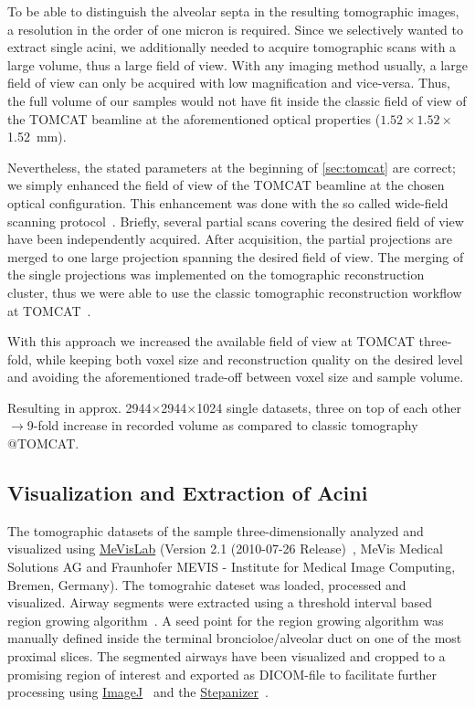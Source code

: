 \documentclass[%
	paper=a4,%
	twoside=true,%
	draft=false,%
	abstract=false]{scrartcl}
\newcommand{\todojcs}[2][]{\todo[color=magenta!62!white, #1]{Johannes: #2}}
\begin{document}
To be able to distinguish the alveolar septa \todojcs{How thick are they in the rat: approx.~\SI{8}{\micro\meter}?} in the resulting tomographic images, a resolution in the order of one micron is required. Since we selectively wanted to extract single acini, we additionally needed to acquire tomographic scans with a large volume, thus a large field of view. With any imaging method usually, a large field of view can only be acquired with low magnification and vice-versa. Thus, the full volume of our samples would not have fit inside the classic field of view of the TOMCAT beamline at the aforementioned optical properties (\(1.52\times1.52\times\)\SI{1.52}{\milli\meter}).

Nevertheless, the stated parameters at the beginning of \autoref{sec:tomcat} are correct; we simply enhanced the field of view of the TOMCAT beamline at the chosen optical configuration. This enhancement was done with the so called wide-field scanning protocol~\cite{Haberthuer2010}. Briefly, several partial scans covering the desired field of view have been independently acquired. After acquisition, the partial projections are merged to one large projection spanning the desired field of view. The merging of the single projections was implemented on the tomographic reconstruction cluster, thus we were able to use the classic tomographic reconstruction workflow at TOMCAT~\cite{Hintermueller2010}.

With this approach we increased the available field of view at TOMCAT three-fold, while keeping both voxel size and reconstruction quality on the desired level and avoiding the aforementioned trade-off between voxel size and sample volume.

Resulting in approx. 2944\(\times\)2944\(\times\)1024 single datasets, three on top of each other \(\rightarrow\)9-fold increase in recorded volume as compared to classic tomography @TOMCAT.

\subsection{Visualization and Extraction of Acini}
The tomographic datasets of the sample three-dimensionally analyzed and visualized using \href{http://mevislab.de}{MeVisLab} (Version 2.1 (2010-07-26 Release)~\cite{Bitter2007}, MeVis Medical Solutions AG and Fraunhofer MEVIS - Institute for Medical Image Computing, Bremen, Germany). The tomograhic dateset was loaded, processed and visualized. Airway segments were extracted using a threshold interval based region growing algorithm~\cite{Zucker1976}. A seed point for the region growing algorithm was manually defined inside the terminal broncioloe/alveolar duct on one of the most proximal slices. The segmented airways have been visualized and cropped to a promising region of interest and exported as DICOM-file to facilitate further processing using \href{http://rsbweb.nih.gov/ij/}{ImageJ}~\cite{Abramoff2004} and the \href{http://stepanizer.com/}{Stepanizer}~\cite{Tschanz2010}.
\end{document}
